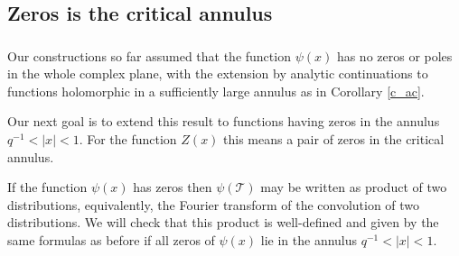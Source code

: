 \documentclass[14pt]{extarticle}
\newcommand{\bC}{\mathsf{C}}
\newcommand{\cT}{\mathscr{T}}
\newcommand{\fg}{\mathfrak{g}}
\newcommand{\fc}{\mathfrak{c}}
\newcommand{\comp}{\textup{cmp}}
\theoremstyle{definition}
\begin{document}

 
 


\subsection{Zeros is the critical annulus}\label{s_zeros}

\subsubsection{}

Our constructions so far assumed that the function $\psi(x)$ has no zeros
or poles in the whole complex plane, with the extension by analytic
continuations to functions holomorphic in a sufficiently large annulus
as in Corollary \ref{c_ac}.

Our next goal is to extend this result to functions having zeros in
the annulus $q^{-1} < |x| < 1$. For the function $Z(x)$ this
means a pair of zeros in the critical annulus.

If the function $\psi(x)$ has zeros then $\psi(\cT)$ may be written as
product of two distributions, equivalently, the Fourier transform of the
convolution of two distributions. We will check that this product
is well-defined and given by the same formulas as before if
all zeros of $\psi(x)$ lie in the annulus $q^{-1} < |x| < 1$.

\subsubsection{}
\end{document}
